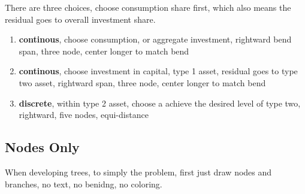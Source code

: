 \documentclass{article}
\begin{document}
There are three choices, choose consumption share first, which also means the residual goes to overall investment share.

\begin{enumerate}
  \item \textbf{continous}, choose consumption, or aggregate investment, rightward bend span, three node, center longer to match bend
  \item \textbf{continous}, choose investment in capital, type 1 asset, residual goes to type two asset, rightward span, three node, center longer to match bend
  \item \textbf{discrete}, within type 2 asset, choose a achieve the desired level of type two, rightward, five nodes, equi-distance
\end{enumerate}

\subsection{Nodes Only}

When developing trees, to simply the problem, first just draw nodes and branches, no text, no benidng, no coloring.

\def\famm{5mm}
\begin{center}
\end{center}




\end{document}
